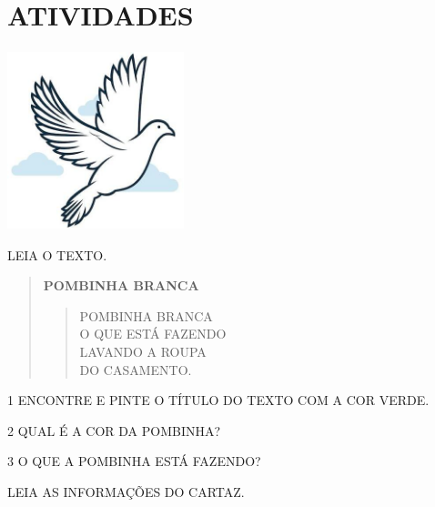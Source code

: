 \section{ATIVIDADES}


\includegraphics[width=2.02153in,height=2.05208in]{media/image126.jpg}

LEIA O TEXTO.

\begin{quote}
\textbf{POMBINHA BRANCA}

\begin{verse}
POMBINHA BRANCA\\
O QUE ESTÁ FAZENDO\\
LAVANDO A ROUPA\\
DO CASAMENTO.
\end{verse}

\end{quote}


\num{1} ENCONTRE E PINTE O TÍTULO DO TEXTO COM A COR VERDE.

\num{2} QUAL É A COR DA POMBINHA?


\num{3} O QUE A POMBINHA ESTÁ FAZENDO?


\pagebreak
LEIA AS INFORMAÇÕES DO CARTAZ.

